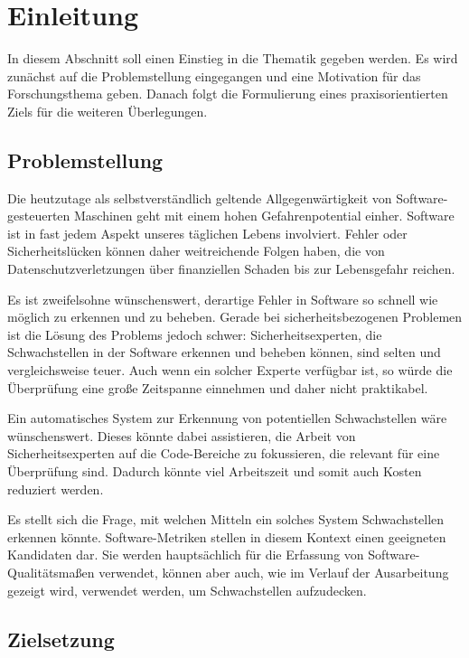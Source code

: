 \section{Einleitung}
In diesem Abschnitt soll einen Einstieg in die Thematik gegeben werden.
Es wird zunächst auf die Problemstellung eingegangen und eine Motivation für das Forschungsthema geben.
Danach folgt die Formulierung eines praxisorientierten Ziels für die weiteren Überlegungen.

\subsection{Problemstellung}
Die heutzutage als selbstverständlich geltende Allgegenwärtigkeit von Software-gesteuerten Maschinen geht mit einem hohen Gefahrenpotential einher.
Software ist in fast jedem Aspekt unseres täglichen Lebens involviert.
Fehler oder Sicherheitslücken können daher weitreichende Folgen haben, die von Datenschutzverletzungen über finanziellen Schaden bis zur Lebensgefahr reichen.

Es ist zweifelsohne wünschenswert, derartige Fehler in Software so schnell wie möglich zu erkennen und zu beheben.
Gerade bei sicherheitsbezogenen Problemen ist die Lösung des Problems jedoch schwer:
Sicherheitsexperten, die Schwachstellen in der Software erkennen und beheben können, sind selten und vergleichsweise teuer.
Auch wenn ein solcher Experte verfügbar ist, so würde die Überprüfung eine große Zeitspanne einnehmen und daher nicht praktikabel.

Ein automatisches System zur Erkennung von potentiellen Schwachstellen wäre wünschenswert.
Dieses könnte dabei assistieren, die Arbeit von Sicherheitsexperten auf die Code-Bereiche zu fokussieren, die relevant für eine Überprüfung sind.
Dadurch könnte viel Arbeitszeit und somit auch Kosten reduziert werden.

Es stellt sich die Frage, mit welchen Mitteln ein solches System Schwachstellen erkennen könnte.
Software-Metriken stellen in diesem Kontext einen geeigneten Kandidaten dar.
Sie werden hauptsächlich für die Erfassung von Software-Qualitätsmaßen verwendet, können aber auch, wie im Verlauf der Ausarbeitung gezeigt wird, verwendet werden, um Schwachstellen aufzudecken.

\subsection{Zielsetzung}
